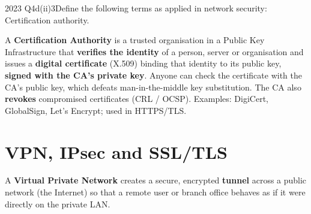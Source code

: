 \documentclass[10pt]{article}
\begin{document}
\begin{pastq}{2023 Q4d(ii)}{3}Define the following terms as applied in network security: Certification authority.\end{pastq}
\begin{ans}
A \textbf{Certification Authority} is a trusted organisation in a Public Key Infrastructure that \textbf{verifies the identity} of a person, server or organisation and issues a \textbf{digital certificate} (X.509) binding that identity to its public key, \textbf{signed with the CA's private key}. Anyone can check the certificate with the CA's public key, which defeats man-in-the-middle key substitution. The CA also \textbf{revokes} compromised certificates (CRL / OCSP). Examples: DigiCert, GlobalSign, Let's Encrypt; used in HTTPS/TLS.
\end{ans}

\section{VPN, IPsec and SSL/TLS}

A \textbf{Virtual Private Network} creates a secure, encrypted \textbf{tunnel} across a public network (the Internet) so that a remote user or branch office behaves as if it were directly on the private LAN.
\end{document}
